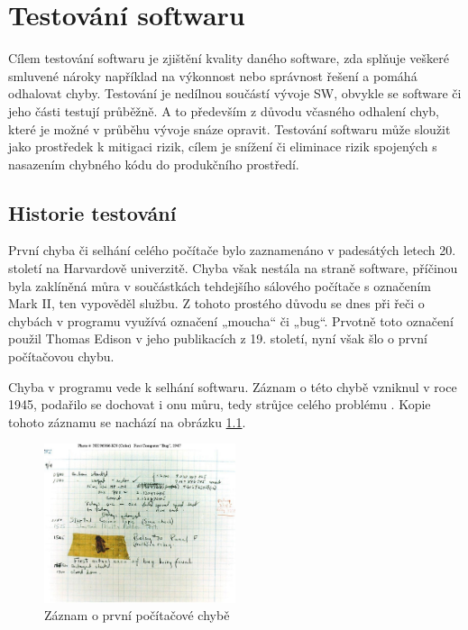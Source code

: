 \chapter{Testování softwaru}
Cílem testování softwaru je zjištění kvality daného software, zda splňuje veškeré smluvené nároky například na výkonnost nebo správnost řešení a pomáhá odhalovat chyby. Testování je nedílnou součástí vývoje SW, obvykle se software či jeho části testují průběžně. A to především z důvodu včasného odhalení chyb, které je možné v průběhu vývoje snáze opravit. Testování softwaru může sloužit jako prostředek k mitigaci rizik, cílem je snížení či eliminace rizik spojených s nasazením chybného kódu do produkčního prostředí.

\section{Historie testování}
První chyba či selhání celého počítače bylo zaznamenáno v padesátých letech 20. století na Harvardově univerzitě. Chyba však nestála na straně software, příčinou byla zaklíněná můra v součástkách tehdejšího sálového počítače s označením Mark II, ten vypověděl službu. Z tohoto prostého důvodu se dnes při řeči o chybách v programu využívá označení „moucha“ či „bug“. Prvotně toto označení použil Thomas Edison v jeho publikacích z 19. století, nyní však šlo o první počítačovou chybu. 

Chyba v programu vede k selhání softwaru. Záznam o této chybě vzniknul v roce 1945, podařilo se dochovat i onu můru, tedy strůjce celého problému \cite{85SxcMZY6LKfV8v4}. Kopie tohoto záznamu se nachází na obrázku \ref{fig:zaznam-o-prvni-chybe}.


\begin{figure}[!h]
	\centering
	\includegraphics[width=0.5\textwidth]{Figures/first-pc-bug.jpg}
	\caption{Záznam o první počítačové chybě \cite{85SxcMZY6LKfV8v4}}
	\label{fig:zaznam-o-prvni-chybe}
\end{figure}

